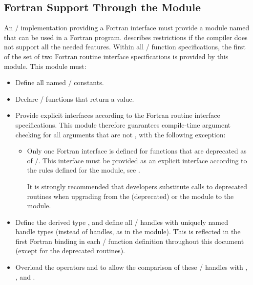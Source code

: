 \subsection{Fortran Support Through the \texorpdfstring{}{mpi\_f08} Module}
\label{f90:mpif08}

An \MPI/ implementation providing a Fortran interface must
provide a module named 
that can be used in a Fortran program.
describes restrictions if the compiler does not support all the needed features.
Within all \MPI/ function specifications,
the first of the set of two Fortran routine interface specifications is provided by this module.
This module must:

\begin{itemize}
\item Define all named \MPI/ constants.
\item Declare \MPI/ functions that return a value.
\item Provide explicit interfaces according to the Fortran routine interface specifications.
This module therefore guarantees compile-time argument checking
for all arguments that are not ,
with the following exception:
\begin{itemize}
\item[] Only one Fortran interface is defined
for functions that are deprecated as of \MPIIIIDOTO/.
This interface must be provided as an explicit interface according to the rules
defined for the  module, see
.
\begin{users}
It is strongly recommended that developers substitute calls to deprecated routines
when upgrading from the (deprecated)  or the  module to the
 module.
\end{users}
\end{itemize}
\item Define the derived type , and define all \MPI/ handles with uniquely named handle types
(instead of  handles, as in the  module).
This is reflected in the first Fortran
binding in each \MPI/ function definition throughout this document
(except for the deprecated routines).
\item Overload the operators  and  to allow the comparison
of these \MPI/ handles with , , \code{==} and \code{/=}.

\end{itemize}
